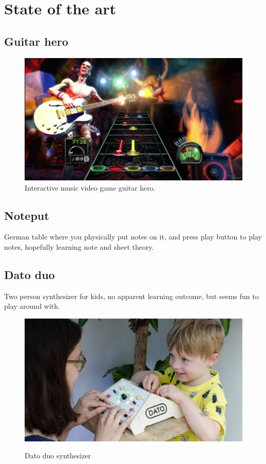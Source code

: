 \section{State of the art}\label{sec:sota}
	
	\subsection{Guitar hero}\label{sec:guitarHero}
		\begin{figure}[H]
			\centering
			\includegraphics[width=0.7\linewidth]{figure/Analysis/guitarhero}
			\caption{Interactive music video game guitar hero.}
			\label{fig:guitarHero}
		\end{figure}
	\subsection{Noteput}
		German table where you physically put notes on it, and press play button to play notes, hopefully learning note and sheet theory.
	\subsection{Dato duo}
		Two person synthesizer for kids, no apparent learning outcome, but seems fun to play around with.
		\begin{figure}[H]
			\centering
			\includegraphics[width=0.7\linewidth]{figure/Analysis/datoduo}
			\label{fig:datoduo}
			\caption{Dato duo synthesizer}
		\end{figure}
